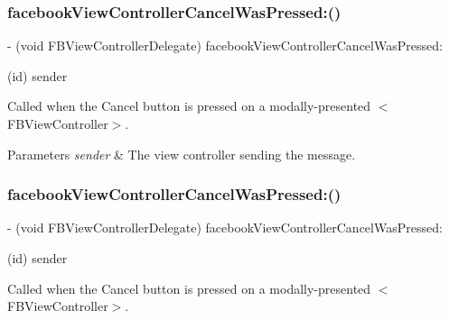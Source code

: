 \subsubsection{\texorpdfstring{facebook\+View\+Controller\+Cancel\+Was\+Pressed\+:()}{facebookViewControllerCancelWasPressed:()}\hspace{0.1cm}{\footnotesize\ttfamily [1/5]}}
{\footnotesize\ttfamily -\/ (void F\+B\+View\+Controller\+Delegate) facebook\+View\+Controller\+Cancel\+Was\+Pressed\+: \begin{DoxyParamCaption}\item[{(id)}]{sender }\end{DoxyParamCaption}\hspace{0.3cm}{\ttfamily [optional]}}

Called when the Cancel button is pressed on a modally-\/presented $<$\+F\+B\+View\+Controller$>$.


\begin{DoxyParams}{Parameters}
{\em sender} & The view controller sending the message. \\
\hline
\end{DoxyParams}
\mbox{\label{protocolFBViewControllerDelegate_01-p_a00faa93faf7a9c1228c24e0fbc87738b}} 
\subsubsection{\texorpdfstring{facebook\+View\+Controller\+Cancel\+Was\+Pressed\+:()}{facebookViewControllerCancelWasPressed:()}\hspace{0.1cm}{\footnotesize\ttfamily [2/5]}}
{\footnotesize\ttfamily -\/ (void F\+B\+View\+Controller\+Delegate) facebook\+View\+Controller\+Cancel\+Was\+Pressed\+: \begin{DoxyParamCaption}\item[{(id)}]{sender }\end{DoxyParamCaption}\hspace{0.3cm}{\ttfamily [optional]}}

Called when the Cancel button is pressed on a modally-\/presented $<$\+F\+B\+View\+Controller$>$.


